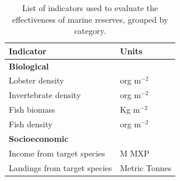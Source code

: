 \documentclass{frontiersSCNS}
\theoremstyle{definition}
\theoremstyle{definition}
\theoremstyle{definition}
\theoremstyle{remark}
\begin{document}
\begin{table}[H]

\caption{\label{tab:unnamed-chunk-10}\label{table:indicators}List of indicators used to evaluate the effectiveness of marine reserves, grouped by category.}
\centering
\begin{tabular}[t]{l|l}
\hline
Indicator & Units\\
\hline
\multicolumn{2}{l}{\textbf{Biological}}\\
\hline
\hspace{1em}Lobster density & org $\mathrm{m}^{-2}$\\
\hline
\hspace{1em}Invertebrate density & org $\mathrm{m}^{-2}$\\
\hline
\hspace{1em}Fish biomass & Kg $\mathrm{m}^{-2}$\\
\hline
\hspace{1em}Fish density & org $\mathrm{m}^{-2}$\\
\hline
\multicolumn{2}{l}{\textbf{Socioeconomic}}\\
\hline
\hspace{1em}Income from target species & M MXP\\
\hline
\hspace{1em}Landings from target species & Metric Tonnes\\
\hline
\end{tabular}
\end{table}
\end{document}

